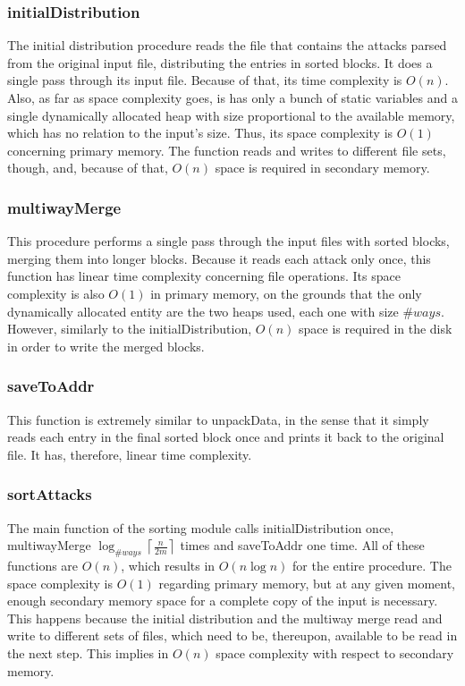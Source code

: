 \documentclass[10pt,a4paper]{article}
\begin{document}
\subsubsection*{initialDistribution}

The initial distribution procedure reads the file that contains the attacks parsed from the original input file, distributing the entries in sorted blocks. It does a single pass through its input file. Because of that, its time complexity is $O(n)$. Also, as far as space complexity goes, is has only a bunch of static variables and a single dynamically allocated heap with size proportional to the available memory, which has no relation to the input's size. Thus, its space complexity is $O(1)$ concerning primary memory. The function reads and writes to different file sets, though, and, because of that, $O(n)$ space is required in secondary memory.

\subsubsection*{multiwayMerge}

This procedure performs a single pass through the input files with sorted blocks, merging them into longer blocks. Because it reads each attack only once, this function has linear time complexity concerning file operations. Its space complexity is also $O(1)$ in primary memory, on the grounds that the only dynamically allocated entity are the two heaps used, each one with size $\#ways$. However, similarly to the initialDistribution, $O(n)$ space is required in the disk in order to write the merged blocks.

\subsubsection*{saveToAddr}

This function is extremely similar to unpackData, in the sense that it simply reads each entry in the final sorted block once and prints it back to the original file. It has, therefore, linear time complexity.

\subsubsection*{sortAttacks}

The main function of the sorting module calls initialDistribution once, multiwayMerge $\log_{\#ways} \left \lceil{\frac{n}{2m}}\right \rceil$ times and saveToAddr one time. All of these functions are $O(n)$, which results in $O(n\log{n})$ for the entire procedure. The space complexity is $O(1)$ regarding primary memory, but at any given moment, enough secondary memory space for a complete copy of the input is necessary. This happens because the initial distribution and the multiway merge read and write to different sets of files, which need to be, thereupon, available to be read in the next step. This implies in $O(n)$ space complexity with respect to secondary memory.
\end{document}
